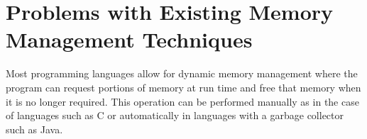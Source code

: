 % 
% 
% 
% 
% 
% 
% 
% 
% 
% 
% 
% 
% 

\section{Problems with Existing Memory Management Techniques}
Most programming languages allow for dynamic memory management where the
program can request portions of memory at run time and free that memory when it
is no longer required. This operation can be performed manually as in the case
of languages such as C or automatically in languages with a garbage collector
such as Java.

